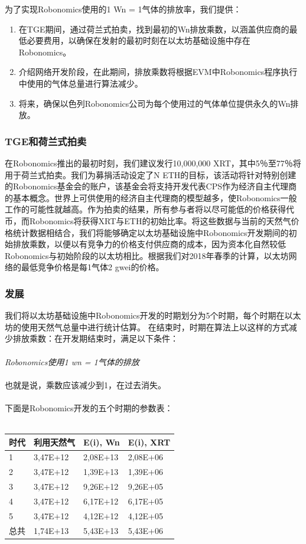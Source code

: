 \documentclass[UTF8]{article}
\begin{document}
为了实现Robonomics使用的1 Wn = 1气体的排放率，我们提供：

\begin{enumerate}
	\item 在TGE期间，通过荷兰式拍卖，找到最初的Wn排放乘数，以涵盖供应商的最低必要费用，以确保在发射的最初时刻在以太坊基础设施中存在Robonomics。
	\item 介绍网络开发阶段，在此期间，排放乘数将根据EVM中Robonomics程序执行中使用的气体总量进行算法减少。
	\item 将来，确保以色列Robonomics公司为每个使用过的气体单位提供永久的Wn排放。
\end{enumerate}

\subsubsection{TGE和荷兰式拍卖}

在Robonomics推出的最初时刻，我们建议发行10,000,000 XRT，其中5％至77％将用于荷兰式拍卖。我们为募捐活动设定了N ETH的目标，该活动将针对特别创建的Robonomics基金会的账户，该基金会将支持开发代表CPS作为经济自主代理商的基本概念。世界上可供使用的经济自主代理商的模型越多，使Robonomics一般工作的可能性就越高。作为拍卖的结果，所有参与者将以尽可能低的价格获得代币，而Robonomics将获得XRT与ETH的初始比率。将这些数据与当前的天然气价格统计数据相结合，我们将能够确定以太坊基础设施中Robonomics开发期间的初始排放乘数，以便以有竞争力的价格支付供应商的成本，因为资本化自然较低Robonomics与初始阶段的以太坊相比。根据我们对2018年春季的计算，以太坊网络的最低​​竞争价格是每1气体2 gwei的价格。

\subsubsection{发展}

我们将以太坊基础设施中Robonomics开发的时期划分为5个时期，每个时期在以太坊的使用天然气总量中进行统计估算。 在结束时，时期在算法上以这样的方式减少排放乘数：在开发期结束时，满足以下条件：
\\
\\
\textit{Robonomics使用1 wn = 1气体的排放}
\\
\\
也就是说，乘数应该减少到1，在过去消失。
\\
\\
下面是Robonomics开发的五个时期的参数表：
\\
\\
\begin{tabular}{ |l |l |l |l}
 \textbf{时代} & \textbf{利用天然气} & \textbf{E(i), Wn} & \textbf{E(i), XRT} \\ 
 \hline
 1 &  3,47E+12 & 2,08E+13 & 2,08E+06 \\ 
 2 &  3,47E+12 & 1,39E+13 & 1,39E+06 \\ 
 3 &  3,47E+12 & 9,26E+12 & 9,26E+05 \\ 
 4 &  3,47E+12 & 6,17E+12 & 6,17E+05 \\ 
 5 &  3,47E+12 & 4,12E+12 & 4,12E+05 \\ 
 总共 &  1,74E+13 & 5,43E+13 & 5,43E+06 \\ 
\end{tabular}
\end{document}

